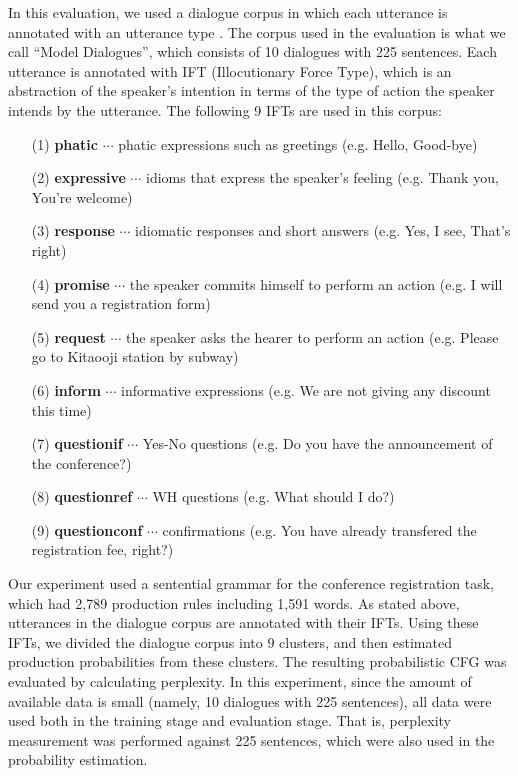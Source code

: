 In this evaluation,
we used a dialogue corpus in which each utterance is annotated with
an utterance type \cite{Nagata94}.
The corpus used in the evaluation is what we call ``Model Dialogues'',
which consists of 10 dialogues with 225 sentences.
Each utterance is annotated with IFT (Illocutionary Force Type),
which is an abstraction of the speaker's intention in terms of the type
of action the speaker intends by the utterance.
The following 9 IFTs are used in this corpus:
\begin{itemize}
\item[(1)] {\bf phatic} $\cdots$
    phatic expressions such as greetings (e.g. Hello, Good-bye)

\item[(2)] {\bf expressive}  $\cdots$
    idioms that express the speaker's feeling (e.g. Thank you, You're welcome)

\item[(3)] {\bf response}  $\cdots$
    idiomatic responses and short answers (e.g. Yes, I see, That's right)

\item[(4)] {\bf promise}  $\cdots$
    the speaker commits himself to perform an action (e.g. I will send you a registration form)

\item[(5)] {\bf request}  $\cdots$
    the speaker asks the hearer to perform an action (e.g. Please go to Kitaooji station by subway)

\item[(6)] {\bf inform}  $\cdots$
    informative expressions (e.g. We are not giving any discount this time)

\item[(7)] {\bf questionif}  $\cdots$
    Yes-No questions (e.g. Do you have the announcement of the conference?)

\item[(8)] {\bf questionref}  $\cdots$
    WH questions (e.g. What should I do?)

\item[(9)] {\bf questionconf}  $\cdots$
    confirmations (e.g. You have already transfered the registration fee, right?)
\end{itemize}


Our experiment used a sentential grammar for the conference registration task,
which had 2,789 production rules including 1,591 words.
As stated above, utterances in the dialogue corpus are annotated with their IFTs.
Using these IFTs, we divided the dialogue corpus into 9 clusters,
and then estimated production probabilities from these clusters.
The resulting probabilistic CFG was evaluated by calculating perplexity.
In this experiment, since the amount of available data is small
(namely, 10 dialogues with 225 sentences),
all data were used both in the training stage and evaluation stage.
That is, perplexity measurement was performed against 225 sentences,
which were also used in the probability estimation.

